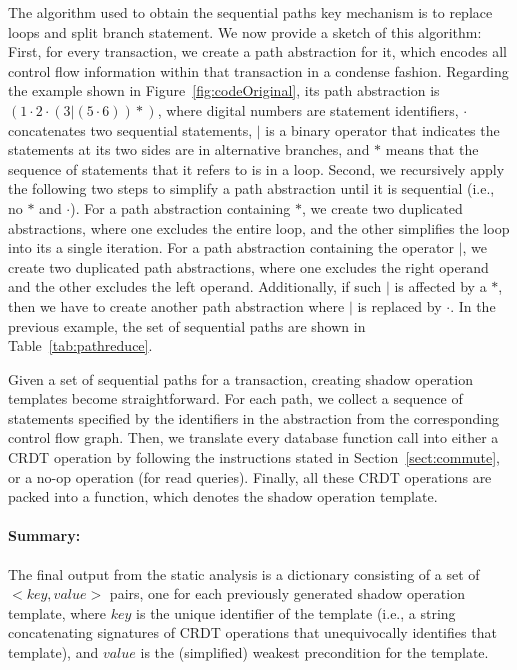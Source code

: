 The algorithm used to obtain the sequential paths key mechanism is to replace loops and split branch statement.
We now provide a sketch of this algorithm: First, for every transaction,
we create a path abstraction for it, which encodes all control flow information within
that transaction in a condense fashion. Regarding the example shown in Figure~\ref{fig:codeOriginal}, 
its path abstraction is $(1\cdot2\cdot(3|(5\cdot6))*)$, where digital numbers
are statement identifiers, $\cdot$ concatenates two sequential statements,
$|$ is a binary operator that indicates the statements at its two sides
are in alternative branches, and $*$ means that the sequence of
statements that it refers to is in a loop.
Second, we recursively apply the following two steps to simplify a path abstraction until 
it is sequential (i.e., no $*$ and $\cdot$). For a path abstraction containing $*$, we create two duplicated
abstractions, where one excludes the entire loop, and the other simplifies the loop into its a single iteration.
For a path abstraction containing the operator $|$, we create two duplicated
path abstractions, where one excludes the right operand and the other
excludes the left operand. Additionally, if such $|$ is affected by
a $*$, then we have to create another path abstraction where $|$ is
replaced by $\cdot$. In the previous example, the set of sequential paths
are shown in Table~\ref{tab:pathreduce}. 

Given a set of sequential paths for a transaction, creating shadow operation templates become
straightforward. For each path, we collect a sequence of
statements specified by the identifiers in the abstraction from the corresponding control flow graph.
Then, we translate every database function call into either a CRDT operation by following
the instructions stated in Section~\ref{sect:commute}, or a no-op operation (for read queries). 
Finally, all these CRDT operations are packed into a function, which
denotes the shadow operation template.

\paragraph{Summary: }The final output from the static analysis is a dictionary consisting of
a set of $<key, value>$ pairs, one for each previously generated shadow operation template, where $key$
is the unique identifier of the template (i.e.,
a string concatenating signatures of CRDT operations that unequivocally identifies that template),
and $value$ is the (simplified) weakest precondition for the template.

